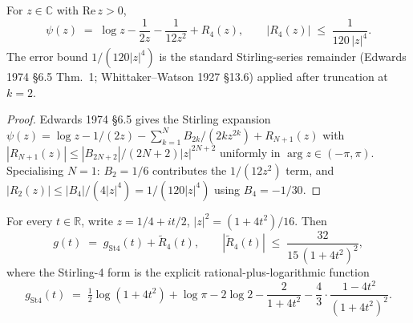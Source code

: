 \begin{lemma}
\label{v4-arith:w7-a:lem:stirling-digamma}
For \(z\in\mathbb{C}\) with \(\mathrm{Re}\,z>0\),
\begin{equation}
\label{v4-arith:w7-a:eq:stirling-digamma}
\psi(z)\;=\;\log z-\frac{1}{2z}-\frac{1}{12z^{2}}+R_{4}(z),
\qquad |R_{4}(z)|\;\leq\;\frac{1}{120\,|z|^{4}}.
\end{equation}
The error bound \(1/(120|z|^{4})\) is the standard Stirling-series
remainder (Edwards 1974 \S6.5 Thm.~1; Whittaker--Watson 1927 \S13.6)
applied after truncation at \(k=2\).
\end{lemma}

\begin{proof}
Edwards 1974 \S6.5 gives the Stirling expansion
\(\psi(z)=\log z-1/(2z)-\sum_{k=1}^{N}B_{2k}/(2k z^{2k})+R_{N+1}(z)\)
with \(|R_{N+1}(z)|\leq|B_{2N+2}|/(2N+2)|z|^{2N+2}\) uniformly in
\(\arg z\in(-\pi,\pi)\). Specialising \(N=1\): \(B_{2}=1/6\) contributes
the \(1/(12z^{2})\) term, and \(|R_{2}(z)|\leq|B_{4}|/(4|z|^{4})=1/(120|z|^{4})\)
using \(B_{4}=-1/30\).
\end{proof}

\begin{proposition}
\label{v4-arith:w7-a:prop:g-stirling-4}
For every \(t\in\mathbb{R}\), write
\(z=1/4+it/2\), \(|z|^{2}=(1+4t^{2})/16\). Then
\begin{equation}
\label{v4-arith:w7-a:eq:g-stirling-4}
g(t)\;=\;g_{\mathrm{St4}}(t)+\widetilde{R}_{4}(t),\qquad
|\widetilde{R}_{4}(t)|\;\leq\;\frac{32}{15\,(1+4t^{2})^{2}},
\end{equation}
where the Stirling-4 form is the explicit rational-plus-logarithmic
function
\begin{equation}
\label{v4-arith:w7-a:eq:g-st4-form}
g_{\mathrm{St4}}(t)\;=\;\tfrac{1}{2}\log(1+4t^{2})+\log\pi-2\log 2-\frac{2}{1+4t^{2}}-\frac{4}{3}\cdot\frac{1-4t^{2}}{(1+4t^{2})^{2}}.
\end{equation}
\end{proposition}

